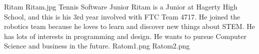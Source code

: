 \insertbio
{Ritam}
{Ritam.jpg}
{Tennis}
{Software}
{Junior}
{
Ritam is a Junior at Hagerty High School, and this is his 3rd year involved with FTC Team 4717. He joined the robotics team because he loves to learn and discover new things about STEM. He has lots of interests in programming and design. He wants to pursue Computer Science and business in the future.
}
{Ratom1.png}
{Ratom2.png}
